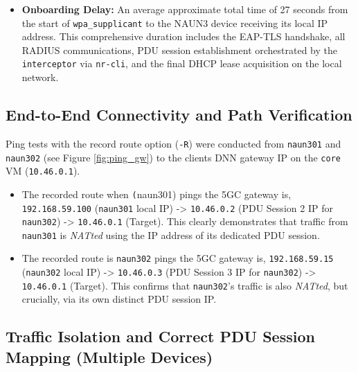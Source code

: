 \begin{itemize}
    \item \textbf{Onboarding Delay:} An average approximate total time of 27 seconds from the start of \texttt{wpa\_supplicant} to the \ac{NAUN3} device receiving its local \ac{IP} address. This comprehensive duration includes the \ac{EAP-TLS} handshake, all \ac{RADIUS} communications, \ac{PDU} session establishment orchestrated by the \texttt{interceptor} via \texttt{nr-cli}, and the final \ac{DHCP} lease acquisition on the local network.
\end{itemize}

\subsection{End-to-End Connectivity and Path Verification}

Ping tests with the record route option (\texttt{-R}) were conducted from \texttt{naun301} and \texttt{naun302} (see Figure \ref{fig:ping_gw}) to the clients \ac{DNN} gateway \ac{IP} on the \texttt{core} \ac{VM} (\texttt{10.46.0.1}).

\begin{itemize}
    \item The recorded route when \texttt(naun301) pings the \ac{5GC} gateway is, \texttt{192.168.59.100} (\texttt{naun301} local \ac{IP}) -> \texttt{10.46.0.2} (\ac{PDU} Session 2 \ac{IP} for \texttt{naun302}) -> \texttt{10.46.0.1} (Target). This clearly demonstrates that traffic from \texttt{naun301} is \textit{NATted} using the \ac{IP} address of its dedicated \ac{PDU} session.

    \item The recorded route is \texttt{naun302} pings the \ac{5GC} gateway is, \texttt{192.168.59.15} (\texttt{naun302} local \ac{IP}) -> \texttt{10.46.0.3} (\ac{PDU} Session 3 \ac{IP} for \texttt{naun302}) -> \texttt{10.46.0.1} (Target). This confirms that \texttt{naun302}'s traffic is also \textit{NATted}, but crucially, via its own distinct \ac{PDU} session \ac{IP}.
\end{itemize}

\subsection{Traffic Isolation and Correct \acs{PDU} Session Mapping (Multiple Devices)}

